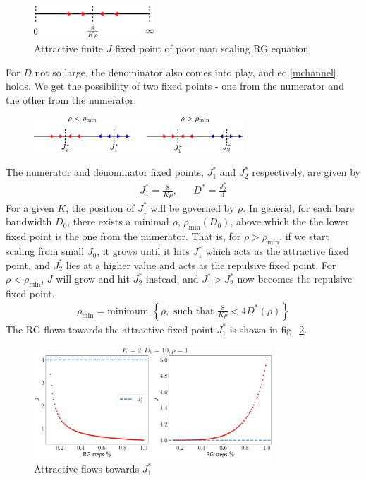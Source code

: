 \documentclass{revtex4-2}
\numberwithin{equation}{section}
\begin{document}
\begin{figure}[!htb]
	\centering
	\includegraphics[width=0.4\textwidth]{rg_flow_pms.pdf}
	\caption{Attractive finite \(J\) fixed point of poor man scaling RG equation}
\end{figure}
For \(D\) not so large, the denominator also comes into play, and eq.\ref{mchannel} holds. We get the possibility of two fixed points - one from the numerator and the other from the numerator.
\begin{figure}[!htb]
	\centering
	\includegraphics[width=0.7\textwidth]{./rg_flow.pdf}
	\caption{}
	\label{rg_flow_general}
\end{figure}

The numerator and denominator fixed points, \(J_1^*\) and \(J_2^*\) respectively, are given by
\begin{equation}\begin{aligned}
	J_1^* = \frac{8}{K \rho}, && D^* = \frac{J_2^*}{4}
\end{aligned}\end{equation}
For a given \(K\), the position of \(J_1^*\) will be governed by \(\rho\). In general, for each bare bandwidth \(D_0\), there exists a minimal \(\rho\), $\rho_\text{min}(D_0)$, above which the the lower fixed point is the one from the numerator. That is, for \(\rho > \rho_\text{min}\), if we start scaling from small \(J_0\), it grows until it hits \(J_1^*\) which acts as the attractive fixed point, and \(J_2^*\) lies at a higher value and acts as the repulsive fixed point. For \(\rho < \rho_\text{min}\), \(J\) will grow and hit \(J_2^*\) instead, and \(J_1^* > J_2^*\) now becomes the repulsive fixed point.
\begin{equation}\begin{aligned}
	\rho_\text{min} = \text{minimum }\left\{\rho, \text{ such that } \frac{8}{K \rho} < 4 D^*(\rho)\right\}
\end{aligned}\end{equation}
The RG flows towards the attractive fixed point \(J_1^*\) is shown  in fig.~\ref{rg_flow_K-2}.
\begin{figure}[!htpb]
	\centering
	\includegraphics[width=0.8\textwidth]{../numerics/rg_flow_K=2.pdf}
	\caption{Attractive flows towards \(J_1^*\)}
	\label{rg_flow_K-2}
\end{figure}
\end{document}
